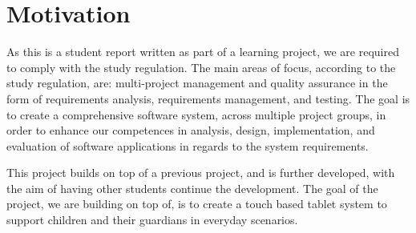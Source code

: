 \section{Motivation}
As this is a student report written as part of a learning project, we are required to comply with the study regulation.
The main areas of focus, according to the study regulation, are: multi-project management and quality assurance in the form of requirements analysis, requirements management, and testing.
The goal is to create a comprehensive software system, across multiple project groups, in order to enhance our competences in analysis, design, implementation, and evaluation of software applications in regards to the system requirements\cite{studyreg}.

This project builds on top of a previous project, and is further developed, with the aim of having other students continue the development.
The goal of the project, we are building on top of, is to create a touch based tablet system to support children and their guardians in everyday scenarios.
